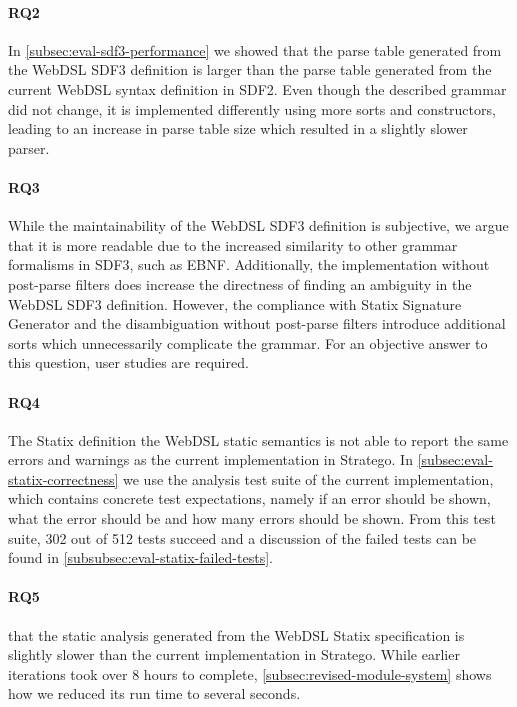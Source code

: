     \paragraph{RQ2} In \cref{subsec:eval-sdf3-performance} we showed that the parse table generated from the WebDSL SDF3 definition is larger than the parse table generated from the current WebDSL syntax definition in SDF2. Even though the described grammar did not change, it is implemented differently using more sorts and constructors, leading to an increase in parse table size which resulted in a slightly slower parser.

    \paragraph{RQ3} While the maintainability of the WebDSL SDF3 definition is subjective, we argue that it is more readable due to the increased similarity to other grammar formalisms in SDF3, such as EBNF. Additionally, the implementation without post-parse filters does increase the directness of finding an ambiguity in the WebDSL SDF3 definition. However, the compliance with Statix Signature Generator and the disambiguation without post-parse filters introduce additional sorts which unnecessarily complicate the grammar. For an objective answer to this question, user studies are required.

    \paragraph{RQ4} The Statix definition the WebDSL static semantics is not able to report the same errors and warnings as the current implementation in Stratego. In \cref{subsec:eval-statix-correctness} we use the analysis test suite of the current implementation, which contains concrete test expectations, namely if an error should be shown, what the error should be and how many errors should be shown. From this test suite, 302 out of 512 tests succeed and a discussion of the failed tests can be found in \cref{subsubsec:eval-statix-failed-tests}.

    \paragraph{RQ5}  that the static analysis generated from the WebDSL Statix specification is slightly slower than the current implementation in Stratego. While earlier iterations took over 8 hours to complete, \cref{subsec:revised-module-system} shows how we reduced its run time to several seconds.
    
